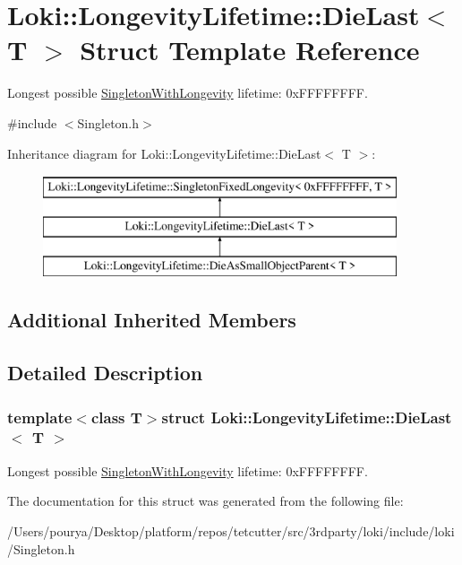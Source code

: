 \hypertarget{structLoki_1_1LongevityLifetime_1_1DieLast}{}\section{Loki\+:\+:Longevity\+Lifetime\+:\+:Die\+Last$<$ T $>$ Struct Template Reference}
\label{structLoki_1_1LongevityLifetime_1_1DieLast}


Longest possible \hyperlink{classLoki_1_1SingletonWithLongevity}{Singleton\+With\+Longevity} lifetime\+: 0x\+F\+F\+F\+F\+F\+F\+F\+F.  




{\ttfamily \#include $<$Singleton.\+h$>$}

Inheritance diagram for Loki\+:\+:Longevity\+Lifetime\+:\+:Die\+Last$<$ T $>$\+:\begin{figure}[H]
\begin{center}
\leavevmode
\includegraphics[height=3.000000cm]{structLoki_1_1LongevityLifetime_1_1DieLast}
\end{center}
\end{figure}
\subsection*{Additional Inherited Members}


\subsection{Detailed Description}
\subsubsection*{template$<$class T$>$struct Loki\+::\+Longevity\+Lifetime\+::\+Die\+Last$<$ T $>$}

Longest possible \hyperlink{classLoki_1_1SingletonWithLongevity}{Singleton\+With\+Longevity} lifetime\+: 0x\+F\+F\+F\+F\+F\+F\+F\+F. 

The documentation for this struct was generated from the following file\+:\begin{DoxyCompactItemize}
\item 
/\+Users/pourya/\+Desktop/platform/repos/tetcutter/src/3rdparty/loki/include/loki/Singleton.\+h\end{DoxyCompactItemize}
